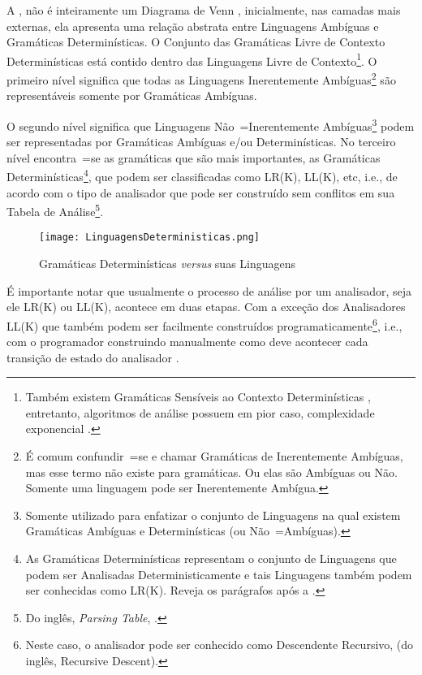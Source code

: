 A ,
não é inteiramente um Diagrama de Venn \cite{generalizedVennDiagrams},
inicialmente,
nas camadas mais externas,
ela apresenta uma relação abstrata entre Linguagens Ambíguas e
Gramáticas Determinísticas.
O Conjunto das Gramáticas Livre de Contexto Determinísticas está contido dentro das Linguagens Livre de Contexto\footnote{
Também existem Gramáticas Sensíveis ao Contexto Determinísticas \cite{contextSensitiveParsing},
entretanto,
algoritmos de análise possuem em pior caso,
complexidade exponencial \cite{areContextSensitiveGrammarWithPolynomialTime}.
}.
O primeiro nível significa que todas as Linguagens Inerentemente Ambíguas\footnote{
É comum confundir~=se e
chamar Gramáticas de Inerentemente Ambíguas,
mas esse termo não existe para gramáticas.
Ou elas são Ambíguas ou
Não.
Somente uma linguagem pode ser Inerentemente Ambígua.
}
são representáveis somente por Gramáticas Ambíguas.

O segundo nível significa que Linguagens Não~=Inerentemente Ambíguas\footnote{
Somente utilizado para enfatizar o conjunto de Linguagens na qual existem Gramáticas Ambíguas e
Determinísticas (ou Não~=Ambíguas).
}
podem ser representadas por Gramáticas Ambíguas e\slash{}ou Determinísticas.
No terceiro nível encontra~=se as gramáticas que são mais importantes,
as Gramáticas Determinísticas\footnote{
As Gramáticas Determinísticas representam o conjunto de Linguagens que podem ser Analisadas Deterministicamente e
tais Linguagens também podem ser conhecidas como LR(K).
Reveja os parágrafos após a .
},
que podem ser classificadas como LR(K),
LL(K), etc, i.e.,
de acordo com o tipo de analisador que pode ser construído sem conflitos em sua Tabela de Análise\footnote{
Do inglês, \textit{Parsing Table},
\cite{ahoCompilerDragonBook}.
}.
\begin{figure}[!htb]
\caption{Gramáticas Determinísticas \textit{versus} suas Linguagens}
\label{LinguagensDeterministicas}
\centering
\texttt{[image: LinguagensDeterministicas.png]}
\end{figure}

É importante notar que usualmente o processo de análise por um analisador,
seja ele LR(K) ou
LL(K),
acontece em duas etapas.
Com a exceção dos Analisadores LL(K) que também podem ser facilmente construídos programaticamente\footnote{
Neste caso,
o analisador pode ser conhecido como Descendente Recursivo,
(do inglês,
Recursive Descent).
},
i.e.,
com o programador construindo manualmente como deve acontecer cada transição de estado do analisador \cite{ahoCompilerDragonBook}.

